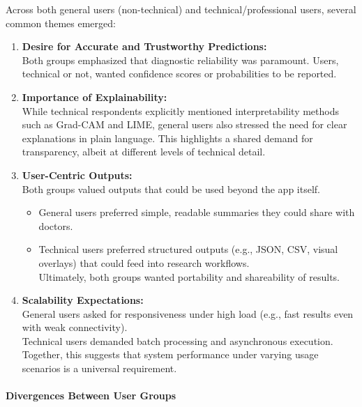 \documentclass[
  12pt,
  oneside]{article}
\providecommand{\tightlist}{%
  \setlength{\itemsep}{0pt}\setlength{\parskip}{0pt}}
\begin{document}
Across both general users (non-technical) and technical/professional
users, several common themes emerged:

\begin{enumerate}
\def\labelenumi{\arabic{enumi}.}
\item
  \textbf{Desire for Accurate and Trustworthy Predictions:}\\
  Both groups emphasized that diagnostic reliability was paramount.
  Users, technical or not, wanted confidence scores or probabilities to
  be reported.
\item
  \textbf{Importance of Explainability:}\\
  While technical respondents explicitly mentioned interpretability
  methods such as Grad-CAM and LIME, general users also stressed the
  need for clear explanations in plain language. This highlights a
  shared demand for transparency, albeit at different levels of
  technical detail.
\item
  \textbf{User-Centric Outputs:}\\
  Both groups valued outputs that could be used beyond the app itself.

  \begin{itemize}
  \tightlist
  \item
    General users preferred simple, readable summaries they could share
    with doctors.\\
  \item
    Technical users preferred structured outputs (e.g., JSON, CSV,
    visual overlays) that could feed into research workflows.\\
    Ultimately, both groups wanted portability and shareability of
    results.
  \end{itemize}
\item
  \textbf{Scalability Expectations:}\\
  General users asked for responsiveness under high load (e.g., fast
  results even with weak connectivity).\\
  Technical users demanded batch processing and asynchronous
  execution.\\
  Together, this suggests that system performance under varying usage
  scenarios is a universal requirement.
\end{enumerate}

\paragraph{Divergences Between User
Groups}\label{divergences-between-user-groups}
\end{document}
